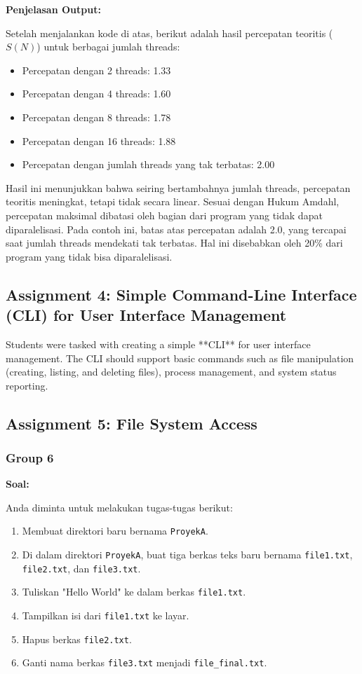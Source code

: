 \documentclass[12pt]{article}
\begin{document}
\textbf{Penjelasan Output:}

Setelah menjalankan kode di atas, berikut adalah hasil percepatan teoritis (\(S(N)\)) untuk berbagai jumlah threads:

\begin{itemize}
    \item Percepatan dengan 2 threads: 1.33
    \item Percepatan dengan 4 threads: 1.60
    \item Percepatan dengan 8 threads: 1.78
    \item Percepatan dengan 16 threads: 1.88
    \item Percepatan dengan jumlah threads yang tak terbatas: 2.00
\end{itemize}

Hasil ini menunjukkan bahwa seiring bertambahnya jumlah threads, percepatan teoritis meningkat, tetapi tidak secara linear. Sesuai dengan Hukum Amdahl, percepatan maksimal dibatasi oleh bagian dari program yang tidak dapat diparalelisasi. Pada contoh ini, batas atas percepatan adalah 2.0, yang tercapai saat jumlah threads mendekati tak terbatas. Hal ini disebabkan oleh 20\% dari program yang tidak bisa diparalelisasi.

\subsection{Assignment 4: Simple Command-Line Interface (CLI) for User Interface Management}
Students were tasked with creating a simple **CLI** for user interface management. The CLI should support basic commands such as file manipulation (creating, listing, and deleting files), process management, and system status reporting.

\subsection{Assignment 5: File System Access}
\subsubsection{Group 6}
\textbf{Soal:}

Anda diminta untuk melakukan tugas-tugas berikut:

\begin{enumerate}
    \item Membuat direktori baru bernama \texttt{ProyekA}.
    \item Di dalam direktori \texttt{ProyekA}, buat tiga berkas teks baru bernama \texttt{file1.txt}, \texttt{file2.txt}, dan \texttt{file3.txt}.
    \item Tuliskan "Hello World" ke dalam berkas \texttt{file1.txt}.
    \item Tampilkan isi dari \texttt{file1.txt} ke layar.
    \item Hapus berkas \texttt{file2.txt}.
    \item Ganti nama berkas \texttt{file3.txt} menjadi \texttt{file\_final.txt}.
\end{enumerate}
\end{document}
